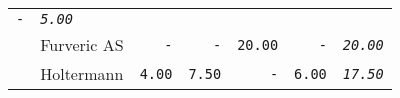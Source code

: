 \documentclass[11pt,A4paper,]{article}
\begin{document}
\begin{longtable}[]{@{}llrrrrr@{}}
\begin{minipage}[t]{0.14\columnwidth}
\texttt{-}\strut
\end{minipage} & \begin{minipage}[t]{0.14\columnwidth}\raggedleft\strut
\emph{\texttt{5.00}}\strut
\end{minipage}\tabularnewline
\begin{minipage}[t]{0.14\columnwidth}\raggedright\strut
\strut
\end{minipage} & \begin{minipage}[t]{0.14\columnwidth}\raggedright\strut
Furveric AS\strut
\end{minipage} & \begin{minipage}[t]{0.14\columnwidth}\raggedleft\strut
\texttt{-}\strut
\end{minipage} & \begin{minipage}[t]{0.14\columnwidth}\raggedleft\strut
\texttt{-}\strut
\end{minipage} & \begin{minipage}[t]{0.14\columnwidth}\raggedleft\strut
\texttt{20.00}\strut
\end{minipage} & \begin{minipage}[t]{0.14\columnwidth}\raggedleft\strut
\texttt{-}\strut
\end{minipage} & \begin{minipage}[t]{0.14\columnwidth}\raggedleft\strut
\emph{\texttt{20.00}}\strut
\end{minipage}\tabularnewline
\begin{minipage}[t]{0.14\columnwidth}\raggedright\strut
\strut
\end{minipage} & \begin{minipage}[t]{0.14\columnwidth}\raggedright\strut
Holtermann\strut
\end{minipage} & \begin{minipage}[t]{0.14\columnwidth}\raggedleft\strut
\texttt{4.00}\strut
\end{minipage} & \begin{minipage}[t]{0.14\columnwidth}\raggedleft\strut
\texttt{7.50}\strut
\end{minipage} & \begin{minipage}[t]{0.14\columnwidth}\raggedleft\strut
\texttt{-}\strut
\end{minipage} & \begin{minipage}[t]{0.14\columnwidth}\raggedleft\strut
\texttt{6.00}\strut
\end{minipage} & \begin{minipage}[t]{0.14\columnwidth}\raggedleft\strut
\emph{\texttt{17.50}}\strut

\end{minipage}
\end{longtable}
\end{document}

